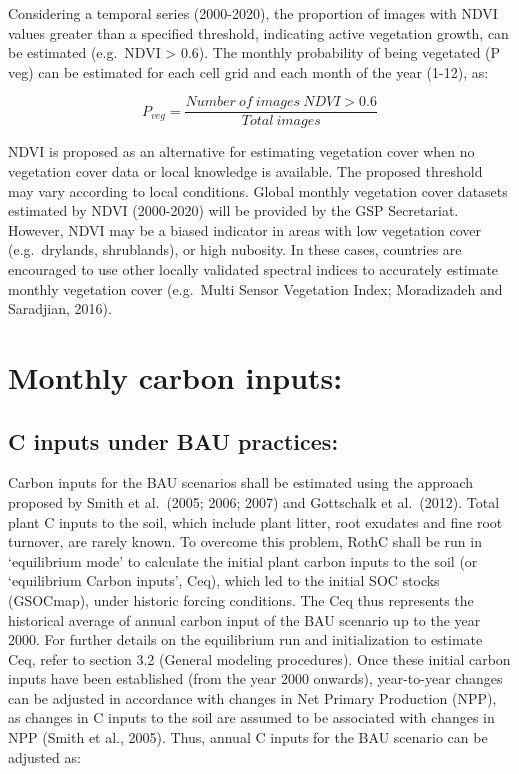 \documentclass[
  10pt,
  b5paper,
]{book}
\begin{document}
Considering a temporal series (2000-2020), the proportion of images with NDVI values greater than a specified threshold, indicating active vegetation growth, can be estimated (e.g.~NDVI \textgreater{} 0.6). The monthly probability of being vegetated (P veg) can be estimated for each cell grid and each month of the year (1-12), as:

\begin{equation}
\tag{6.3}
P_{veg} = \frac{Number\ of \ images \ NDVI > 0.6}{Total \ images}  
\end{equation}

NDVI is proposed as an alternative for estimating vegetation cover when no vegetation cover data or local knowledge is available. The proposed threshold may vary according to local conditions. Global monthly vegetation cover datasets estimated by NDVI (2000-2020) will be provided by the GSP Secretariat. However, NDVI may be a biased indicator in areas with low vegetation cover (e.g.~drylands, shrublands), or high nubosity. In these cases, countries are encouraged to use other locally validated spectral indices to accurately estimate monthly vegetation cover (e.g.~Multi Sensor Vegetation Index; Moradizadeh and Saradjian, 2016).

\hypertarget{monthly-carbon-inputs}{%
\section{Monthly carbon inputs:}\label{monthly-carbon-inputs}}

\hypertarget{c-inputs-under-bau-practices}{%
\subsection{C inputs under BAU practices:}\label{c-inputs-under-bau-practices}}

Carbon inputs for the BAU scenarios shall be estimated using the approach proposed by Smith et al.~(2005; 2006; 2007) and Gottschalk et al.~(2012). Total plant C inputs to the soil, which include plant litter, root exudates and fine root turnover, are rarely known. To overcome this problem, RothC shall be run in `equilibrium mode' to calculate the initial plant carbon inputs to the soil (or `equilibrium Carbon inputs', Ceq), which led to the initial SOC stocks (GSOCmap), under historic forcing conditions. The Ceq thus represents the historical average of annual carbon input of the BAU scenario up to the year 2000. For further details on the equilibrium run and initialization to estimate Ceq, refer to section 3.2 (General modeling procedures).
Once these initial carbon inputs have been established (from the year 2000 onwards), year-to-year changes can be adjusted in accordance with changes in Net Primary Production (NPP), as changes in C inputs to the soil are assumed to be associated with changes in NPP (Smith et al., 2005). Thus, annual C inputs for the BAU scenario can be adjusted as:
\end{document}

